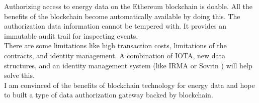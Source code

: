 \documentclass[paper=a4, fontsize=11pt]{scrartcl}
\numberwithin{equation}{section} %
\numberwithin{figure}{section}   %
\numberwithin{table}{section}    %
\begin{document}
Authorizing access to energy data on the Ethereum blockchain is doable. All the
benefits of the blockchain become automatically available by doing this. The
authorization data information cannot be tempered with. It provides an immutable
audit trail for inspecting events.\\

There are some limitations like high transaction costs, limitations of the
contracts, and identity management. A combination of IOTA, new data structures,
and an identity management system (like IRMA \cite{irma} or Sovrin
\cite{sovrin}) will help solve this.\\

I am convinced of the benefits of blockchain technology for energy data and hope
to built a type of data authorization gateway backed by blockchain.\\



\end{document}
